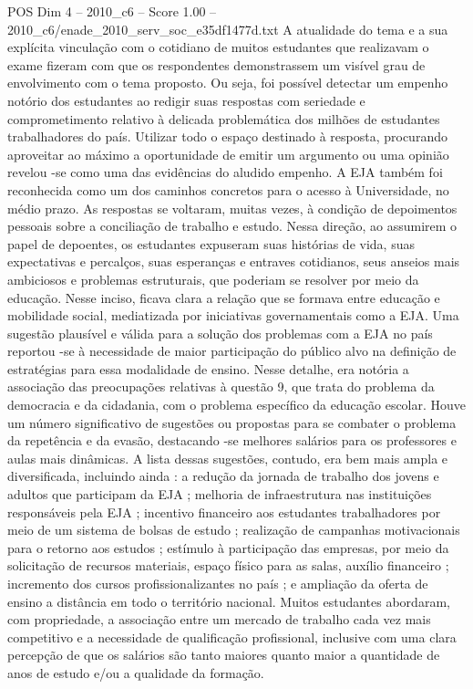 \begin{textsample}{POS Dim 4 – 2010\_c6 – Score 1.00 – 2010\_c6/enade\_2010\_serv\_soc\_e35df1477d.txt}
A atualidade do tema e a sua explícita vinculação com o cotidiano de muitos estudantes que realizavam o exame fizeram com que os respondentes demonstrassem um visível grau de envolvimento com o tema proposto.
Ou seja, foi possível detectar um empenho notório dos estudantes ao redigir suas respostas com seriedade e comprometimento relativo à delicada problemática dos milhões de estudantes trabalhadores do país.
Utilizar todo o espaço destinado à resposta, procurando aproveitar ao máximo a oportunidade de emitir um argumento ou uma opinião revelou -se como uma das evidências do aludido empenho.
A EJA também foi reconhecida como um dos caminhos concretos para o acesso à Universidade, no médio prazo.
As respostas se voltaram, muitas vezes, à condição de depoimentos pessoais sobre a conciliação de trabalho e estudo.
Nessa direção, ao assumirem o papel de depoentes, os estudantes expuseram suas histórias de vida, suas expectativas e percalços, suas esperanças e entraves cotidianos, seus anseios mais ambiciosos e problemas estruturais, que poderiam se resolver por meio da educação.
Nesse inciso, ficava clara a relação que se formava entre educação e mobilidade social, mediatizada por iniciativas governamentais como a EJA.
Uma sugestão plausível e válida para a solução dos problemas com a EJA no país reportou -se à necessidade de maior participação do público alvo na definição de estratégias para essa modalidade de ensino.
Nesse detalhe, era notória a associação das preocupações relativas à questão 9, que trata do problema da democracia e da cidadania, com o problema específico da educação escolar.
Houve um número significativo de sugestões ou propostas para se combater o problema da repetência e da evasão, destacando -se melhores salários para os professores e aulas mais dinâmicas.
A lista dessas sugestões, contudo, era bem mais ampla e diversificada, incluindo ainda : a redução da jornada de trabalho dos jovens e adultos que participam da EJA ; melhoria de infraestrutura nas instituições responsáveis pela EJA ; incentivo financeiro aos estudantes trabalhadores por meio de um sistema de bolsas de estudo ; realização de campanhas motivacionais para o retorno aos estudos ; estímulo à participação das empresas, por meio da solicitação de recursos materiais, espaço físico para as salas, auxílio financeiro ; incremento dos cursos profissionalizantes no país ; e ampliação da oferta de ensino a distância em todo o território nacional.
Muitos estudantes abordaram, com propriedade, a associação entre um mercado de trabalho cada vez mais competitivo e a necessidade de qualificação profissional, inclusive com uma clara percepção de que os salários são tanto maiores quanto maior a quantidade de anos de estudo e/ou a qualidade da formação.

\end{textsample}
